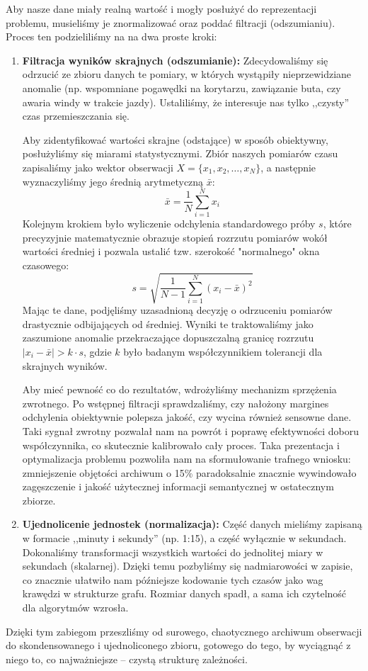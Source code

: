 \documentclass[12pt,a4paper]{article}
\begin{document}
Aby nasze dane miały realną wartość i mogły posłużyć do reprezentacji problemu, musieliśmy je znormalizować oraz poddać filtracji (odszumianiu). Proces ten podzieliliśmy na na dwa proste kroki:

\begin{enumerate}
    \item \textbf{Filtracja wyników skrajnych (odszumianie):} Zdecydowaliśmy się odrzucić ze zbioru danych te pomiary, w których wystąpiły nieprzewidziane anomalie (np. wspomniane pogawędki na korytarzu, zawiązanie buta, czy awaria windy w trakcie jazdy). Ustaliliśmy, że interesuje nas tylko ,,czysty'' czas przemieszczania się. 
    
    Aby zidentyfikować wartości skrajne (odstające) w sposób obiektywny, posłużyliśmy się miarami statystycznymi. Zbiór naszych pomiarów czasu zapisaliśmy jako wektor obserwacji $X = \{x_1, x_2, \dots, x_N\}$, a następnie wyznaczyliśmy jego średnią arytmetyczną $\bar{x}$:
    \begin{equation}
        \bar{x} = \frac{1}{N} \sum_{i=1}^{N} x_i
    \end{equation}
    Kolejnym krokiem było wyliczenie odchylenia standardowego próby $s$, które precyzyjnie matematycznie obrazuje stopień rozrzutu pomiarów wokół wartości średniej i pozwala ustalić tzw. szerokość "normalnego" okna czasowego:
    \begin{equation}
        s = \sqrt{\frac{1}{N-1} \sum_{i=1}^{N} (x_i - \bar{x})^2}
    \end{equation}
    Mając te dane, podjęliśmy uzasadnioną decyzję o odrzuceniu pomiarów drastycznie odbijających od średniej. Wyniki te traktowaliśmy jako zaszumione anomalie przekraczające dopuszczalną granicę rozrzutu $|x_i - \bar{x}| > k \cdot s$, gdzie $k$ było badanym współczynnikiem tolerancji dla skrajnych wyników.
    
    Aby mieć pewność co do rezultatów, wdrożyliśmy mechanizm sprzężenia zwrotnego. Po wstępnej filtracji sprawdzaliśmy, czy nałożony margines odchylenia obiektywnie polepsza jakość, czy wycina również sensowne dane. Taki sygnał zwrotny pozwalał nam na powrót i poprawę efektywności doboru współczynnika, co skutecznie kalibrowało cały proces. Taka prezentacja i optymalizacja problemu pozwoliła nam na sformułowanie trafnego wniosku: zmniejszenie objętości archiwum o 15\% paradoksalnie znacznie wywindowało zagęszczenie i jakość użytecznej informacji semantycznej w ostatecznym zbiorze.
    
    \item \textbf{Ujednolicenie jednostek (normalizacja):} Część danych mieliśmy zapisaną w formacie ,,minuty i sekundy'' (np. 1:15), a część wyłącznie w sekundach. Dokonaliśmy transformacji wszystkich wartości do jednolitej miary w sekundach (skalarnej). Dzięki temu pozbyliśmy się nadmiarowości w zapisie, co znacznie ułatwiło nam późniejsze kodowanie tych czasów jako wag krawędzi w strukturze grafu. Rozmiar danych spadł, a sama ich czytelność dla algorytmów wzrosła.
\end{enumerate}

Dzięki tym zabiegom przeszliśmy od surowego, chaotycznego archiwum obserwacji do skondensowanego i ujednoliconego zbioru, gotowego do tego, by wyciągnąć z niego to, co najważniejsze -- czystą strukturę zależności.
\end{document}
